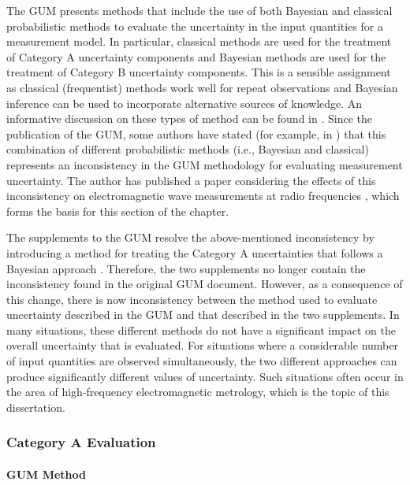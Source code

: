 \documentclass[../thesis/thesis.tex]{subfiles}
\begin{document}
The GUM presents methods that include the use of both Bayesian and classical probabilistic methods to evaluate the uncertainty in the input quantities for a measurement model. In particular, classical methods \cite{Neyman_1937} are used for the treatment of Category A uncertainty components and Bayesian methods \cite{Gelman_2013} are used for the treatment of Category B uncertainty components. This is a sensible assignment as classical (frequentist) methods work well for repeat observations and Bayesian inference can be used to incorporate alternative sources of knowledge. An informative discussion on these types of method can be found in \cite{White_2016}. Since the publication of the GUM, some authors have stated (for example, in \cite{Kacker_2006,Kacker_2005,Kacker_2003,Bich_2014}) that this combination of different probabilistic methods (i.e., Bayesian and classical) represents an inconsistency in the GUM methodology for evaluating measurement uncertainty. The author has published a paper considering the effects of this inconsistency on electromagnetic wave measurements at radio frequencies \cite{Stant_2016}, which forms the basis for this section of the chapter.

The supplements to the GUM \cite{GUM_S1,GUM_S2} resolve the above-mentioned inconsistency by introducing a method for treating the Category A uncertainties that follows a Bayesian approach \cite{Elster_2007}. Therefore, the two supplements no longer contain the inconsistency found in the original GUM document. However, as a consequence of this change, there is now inconsistency between the method used to evaluate uncertainty described in the GUM and that described in the two supplements. In many situations, these different methods do not have a significant impact on the overall uncertainty that is evaluated. For situations where a considerable number of input quantities are observed simultaneously, the two different approaches can produce significantly different values of uncertainty. Such situations often occur in the area of high-frequency electromagnetic metrology, which is the topic of this dissertation.

\subsubsection{Category A Evaluation}

\paragraph{GUM Method}
\end{document}
